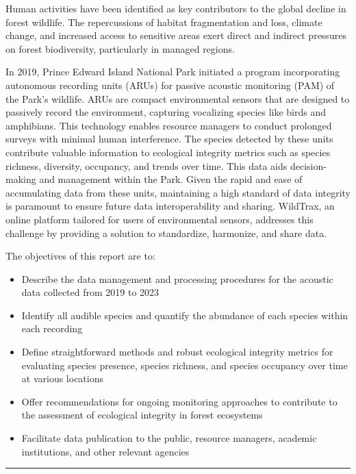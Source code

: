 \documentclass[
  letterpaper,
  DIV=11,
  numbers=noendperiod,
  oneside]{scrartcl}
\providecommand{\tightlist}{%
  \setlength{\itemsep}{0pt}\setlength{\parskip}{0pt}}\usepackage{longtable,booktabs,array}
\begin{document}
Human activities have been identified as key contributors to the global
decline in forest wildlife. The repercussions of habitat fragmentation
and loss, climate change, and increased access to sensitive areas exert
direct and indirect pressures on forest biodiversity, particularly in
managed regions.

In 2019, Prince Edward Island National Park initiated a program
incorporating autonomous recording units (ARUs) for passive acoustic
monitoring (PAM) of the Park's wildlife. ARUs are compact environmental
sensors that are designed to passively record the environment, capturing
vocalizing species like birds and amphibians. This technology enables
resource managers to conduct prolonged surveys with minimal human
interference. The species detected by these units contribute valuable
information to ecological integrity metrics such as species richness,
diversity, occupancy, and trends over time. This data aids
decision-making and management within the Park. Given the rapid and ease
of accumulating data from these units, maintaining a high standard of
data integrity is paramount to ensure future data interoperability and
sharing. WildTrax, an online platform tailored for users of
environmental sensors, addresses this challenge by providing a solution
to standardize, harmonize, and share data.

The objectives of this report are to:

\begin{itemize}
\tightlist
\item
  Describe the data management and processing procedures for the
  acoustic data collected from 2019 to 2023
\item
  Identify all audible species and quantify the abundance of each
  species within each recording
\item
  Define straightforward methods and robust ecological integrity metrics
  for evaluating species presence, species richness, and species
  occupancy over time at various locations
\item
  Offer recommendations for ongoing monitoring approaches to contribute
  to the assessment of ecological integrity in forest ecosystems
\item
  Facilitate data publication to the public, resource managers, academic
  institutions, and other relevant agencies
\end{itemize}

\begin{center}\rule{0.5\linewidth}{0.5pt}\end{center}
\end{document}
